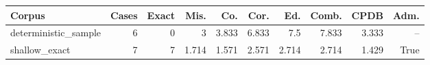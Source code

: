 {\scriptsize
\setlength{\tabcolsep}{3pt}
\begin{tabular}{lrrrrrrrrr}
\hline
Corpus & Cases & Exact & Mis. & Co. & Cor. & Ed. & Comb. & CPDB & Adm. \\
\hline
deterministic\_sample & 6 & 0 & 3 & 3.833 & 6.833 & 7.5 & 7.833 & 3.333 & -- \\
shallow\_exact & 7 & 7 & 1.714 & 1.571 & 2.571 & 2.714 & 2.714 & 1.429 & True \\
\hline
\end{tabular}
}
